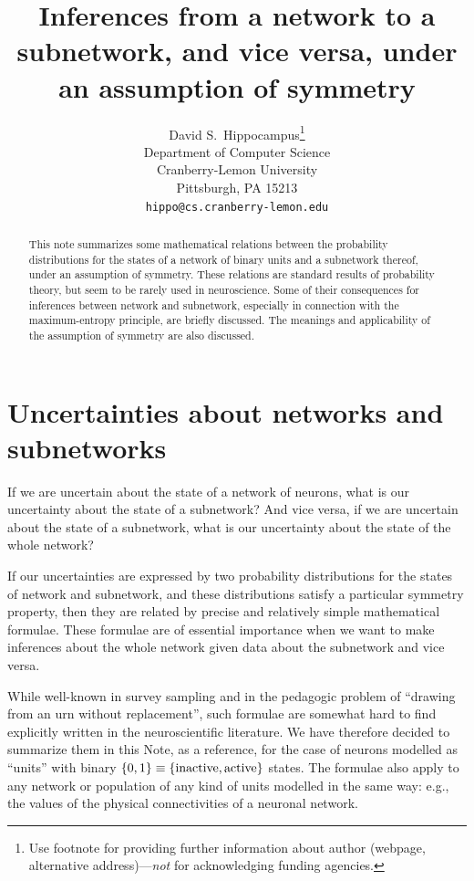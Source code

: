 \documentclass{article}
\title{Inferences from a network to a subnetwork, and vice versa, under an assumption of symmetry}
\author{
  David S.~Hippocampus\thanks{Use footnote for providing further
    information about author (webpage, alternative
    address)---\emph{not} for acknowledging funding agencies.} \\
  Department of Computer Science\\
  Cranberry-Lemon University\\
  Pittsburgh, PA 15213 \\
  \texttt{hippo@cs.cranberry-lemon.edu} \\
}
\theoremstyle{innote}
\DeclarePairedDelimiter\set{\{}{\}}
\newcommand*{\eg}{{e.g.}}
\renewcommand*{\|}{\cond}
\newcommand*{\+}{\lor}
\begin{document}

\maketitle

\begin{abstract}%
\noindent
This note summarizes some mathematical relations between the probability
distributions for the states of a network of binary units and a subnetwork
thereof, under an assumption of symmetry. These relations are standard
results of probability theory, but seem to be rarely used in neuroscience.
Some of their consequences for inferences between network and subnetwork,
especially in connection with the maximum-entropy principle, are briefly
discussed. The meanings and applicability of the assumption of symmetry
are also discussed.
\end{abstract}













\section{Uncertainties about networks and subnetworks}
\label{sec:intro}

If we are uncertain about the state of a network of neurons,
what is our uncertainty about the state of a subnetwork? And
vice versa, if we are uncertain about the state of a subnetwork, what is
our uncertainty about the state of the whole network?

If our uncertainties are expressed by two probability distributions for
the states of network and subnetwork, and these distributions satisfy a
particular symmetry property, then they are related by precise and relatively
simple mathematical formulae. These formulae are of essential importance
when we want to make inferences about the whole network given data about
the subnetwork and vice versa.

While well-known in survey sampling and in the pedagogic problem of
\enquote{drawing from an urn without replacement}, such formulae are
somewhat hard to find explicitly written in the neuroscientific literature.
We have therefore decided to summarize them in this Note, as a reference,
for the case of neurons modelled as \enquote{units} with binary
$\set{0,1} \equiv \set{\text{inactive}, \text{active}}$ states. The
formulae also apply to any network or population of any kind of units
modelled in the same way: \eg, the values of the physical
connectivities of a neuronal network.
\end{document}
